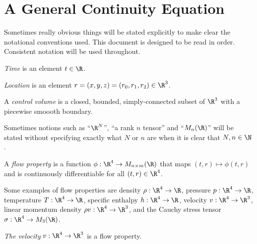 \section{A General Continuity Equation}

\begin{rk}
Sometimes really obvious things will be stated explicitly to
make clear the notational conventions used.
This document is designed to be read in order.
Consistent notation will be used throughout.
\end{rk}

\begin{df}[Time]
    \emph{Time} is an element $t\in \R$.
\end{df}

\begin{df}[Location]
    \emph{Location} is an element $r=(x,y,z)=(r_0,r_1,r_2)\in \R^3$.
\end{df}

\begin{df}
    A \emph{control volume} is a closed, bounded,
    simply-connected subset of $\R^3$ with a piecewise smoooth boundary.
\end{df}

\begin{rk}
Sometimes notions such as ``$\R^N$'', ``a rank $n$ tensor'' and ``$M_n(\R)$''
will be stated without specifying exactly what $N$ or $n$ are when it
is clear that $N,n\in\N$.
\end{rk}

\begin{df}
A \emph{flow property} is a function
$\phi:\R^4 \to M_{n\times m}(\R)$ that maps $(t,r)\mapsto \phi(t,r)$
and is continuously differentiable for all $(t,r)\in \R^4$.
\end{df}

\begin{rk}
Some examples of flow properties are density $\rho:\R^4\to \R$, 
pressure $p:\R^4\to \R$, temperature $T:\R^4\to \R$, specific enthalpy $h:\R^4\to \R$,
velocity $v:\R^4\to \R^3$, linear momentum density $\rho v:\R^4\to \R^3$,
and the Cauchy stress tensor $\sigma:\R^4\to M_3(\R)$.
\end{rk}

\begin{df}[Velocity]
\emph{The velocity} $v:\R^4\to \R^3$ is a flow property.
\end{df}

